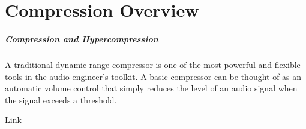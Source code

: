 

\chapter{Compression Overview}
\label{cha:compression-overview}

\paragraph{Compression and Hypercompression} A traditional
dynamic range compressor is one of the most powerful and flexible
tools in the audio engineer's toolkit.  A basic compressor can be
thought of as an automatic volume control that simply reduces the
level of an audio signal when the signal exceeds a threshold. 



\href{http://web.media.mit.edu/~holbrow/mas/reflections/?q=%7B%22mirrors%22%3A%5B%5B%22Path%22%2C%7B%22applyMatrix%22%3Atrue%2C%22segments%22%3A%5B%5B%5B330%2C60%5D%2C%5B0%2C0%5D%2C%5B-239%2C185%5D%5D%2C%5B319%2C424%5D%5D%2C%22strokeColor%22%3A%5B0%2C0%2C0%5D%2C%22strokeWidth%22%3A2%7D%5D%2C%5B%22Path%22%2C%7B%22applyMatrix%22%3Atrue%2C%22segments%22%3A%5B%5B%5B1035%2C436%5D%2C%5B0%2C0%5D%2C%5B-135%2C113%5D%5D%2C%5B1123%2C534%5D%5D%2C%22strokeColor%22%3A%5B0%2C0%2C0%5D%2C%22strokeWidth%22%3A2%7D%5D%5D%2C%22sounds%22%3A%5B%5B%22Path%22%2C%7B%22applyMatrix%22%3Atrue%2C%22segments%22%3A%5B%5B1047%2C123%5D%2C%5B1048%2C145%5D%5D%2C%22strokeColor%22%3A%5B0.6%2C0.6%2C0.6902%5D%7D%5D%2C%5B%22Path%22%2C%7B%22applyMatrix%22%3Atrue%2C%22segments%22%3A%5B%5B411%2C176%5D%2C%5B480%2C136%5D%5D%2C%22strokeColor%22%3A%5B0.6%2C0.6%2C0.6902%5D%7D%5D%5D%7D}{Link}


